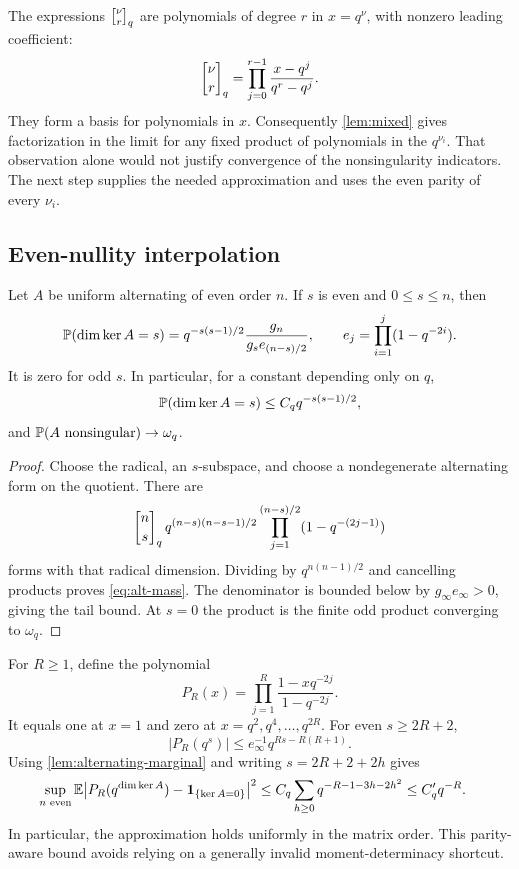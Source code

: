 The expressions $\qbinom{\nu}{r}$ are polynomials of degree $r$ in
$x=q^\nu$, with nonzero leading coefficient:
\[
 \qbinom{\nu}{r}=
 \prod_{j=0}^{r-1}\frac{x-q^j}{q^r-q^j}.
\]
They form a basis for polynomials in $x$. Consequently
\cref{lem:mixed} gives factorization in the limit for any fixed product of
polynomials in the $q^{\nu_i}$. That observation alone would not justify
convergence of the nonsingularity indicators. The next step supplies the
needed approximation and uses the even parity of every $\nu_i$.

\subsection{Even-nullity interpolation}

\begin{lemma}
\label{lem:alternating-marginal}
Let $A$ be uniform alternating of even order $n$. If $s$ is even and
$0\le s\le n$, then
\begin{equation}
 \mathbb P(\dim\ker A=s)
 =q^{-s(s-1)/2}\frac{g_n}{g_s e_{(n-s)/2}},\qquad
 e_j=\prod_{i=1}^j(1-q^{-2i}).
 \label{eq:alt-mass}
\end{equation}
It is zero for odd $s$. In particular, for a constant depending only on $q$,
\[
 \mathbb P(\dim\ker A=s)\le C_q q^{-s(s-1)/2},
\]
and $\mathbb P(A\text{ nonsingular})\to\omega_q$.
\end{lemma}

\begin{proof}
Choose the radical, an $s$-subspace, and choose a nondegenerate alternating
form on the quotient. There are
\[
 \qbinom ns\,
 q^{(n-s)(n-s-1)/2}
 \prod_{j=1}^{(n-s)/2}(1-q^{-(2j-1)})
\]
forms with that radical dimension. Dividing by $q^{n(n-1)/2}$ and cancelling
products proves \eqref{eq:alt-mass}. The denominator is bounded below by
$g_\infty e_\infty>0$, giving the tail bound. At $s=0$ the product is
the finite odd product converging to $\omega_q$.
\end{proof}

For $R\ge1$, define the polynomial
\begin{equation}
 P_R(x)=\prod_{j=1}^R\frac{1-xq^{-2j}}{1-q^{-2j}}.
 \label{eq:interpolation}
\end{equation}
It equals one at $x=1$ and zero at $x=q^2,q^4,\ldots,q^{2R}$.
For even $s\ge2R+2$,
\[
 |P_R(q^s)|\le e_\infty^{-1}q^{Rs-R(R+1)}.
\]
Using \cref{lem:alternating-marginal} and writing $s=2R+2+2h$ gives
\begin{align}
 \sup_{n\text{ even}}
 \mathbb E\bigl|P_R(q^{\dim\ker A})-\mathbf 1_{\{\ker A=0\}}\bigr|^2
 &\le C_q\sum_{h\ge0}q^{-R-1-3h-2h^2}
 \le C'_q q^{-R}.
 \label{eq:L2-approx}
\end{align}
In particular, the approximation holds uniformly in the matrix order. This
parity-aware bound avoids relying on a generally invalid moment-determinacy
shortcut.

